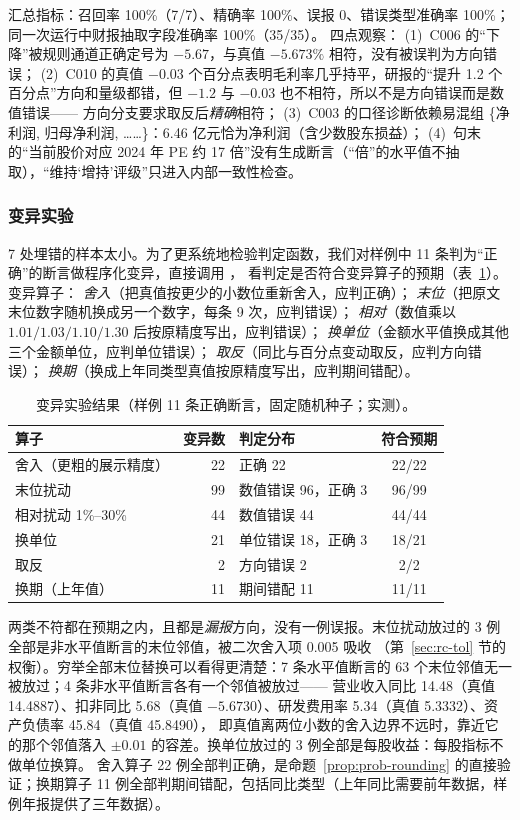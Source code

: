 汇总指标：召回率 100\%（7/7）、精确率 100\%、误报 0、错误类型准确率 100\%；同一次运行中财报抽取字段准确率 100\%（35/35）。
四点观察：
(1)~C006 的“下降”被规则通道正确定号为 $-5.67$，与真值 $-5.673\%$ 相符，没有被误判为方向错误；
(2)~C010 的真值 $-0.03$ 个百分点表明毛利率几乎持平，研报的“提升 1.2 个百分点”方向和量级都错，但 $-1.2$ 与 $-0.03$ 也不相符，所以不是方向错误而是数值错误——
方向分支要求取反后\emph{精确}相符；
(3)~C003 的口径诊断依赖易混组 \{净利润, 归母净利润, ……\}：6.46 亿元恰为净利润（含少数股东损益）；
(4)~句末的“当前股价对应 2024 年 PE 约 17 倍”没有生成断言（“倍”的水平值不抽取），“维持‘增持’评级”只进入内部一致性检查。

\subsubsection{变异实验}
\label{sec:rc-mutation}

7 处埋错的样本太小。为了更系统地检验判定函数，我们对样例中 11 条判为“正确”的断言做程序化变异，直接调用 ，
看判定是否符合变异算子的预期（表~\ref{tab:rc-mutation}）。变异算子：
\emph{舍入}（把真值按更少的小数位重新舍入，应判正确）；
\emph{末位}（把原文末位数字随机换成另一个数字，每条 9 次，应判错误）；
\emph{相对}（数值乘以 $1.01/1.03/1.10/1.30$ 后按原精度写出，应判错误）；
\emph{换单位}（金额水平值换成其他三个金额单位，应判单位错误）；
\emph{取反}（同比与百分点变动取反，应判方向错误）；
\emph{换期}（换成上年同类型真值按原精度写出，应判期间错配）。

\begin{table}[t]
\centering
\caption{变异实验结果（样例 11 条正确断言，固定随机种子；实测）。}
\label{tab:rc-mutation}
\small
\begin{tabular}{@{}lrlc@{}}
\toprule
算子 & 变异数 & 判定分布 & 符合预期 \\
\midrule
舍入（更粗的展示精度） & 22 & 正确 22 & 22/22 \\
末位扰动 & 99 & 数值错误 96，正确 3 & 96/99 \\
相对扰动 1\%--30\% & 44 & 数值错误 44 & 44/44 \\
换单位 & 21 & 单位错误 18，正确 3 & 18/21 \\
取反 & 2 & 方向错误 2 & 2/2 \\
换期（上年值） & 11 & 期间错配 11 & 11/11 \\
\bottomrule
\end{tabular}
\end{table}

两类不符都在预期之内，且都是\emph{漏报}方向，没有一例误报。末位扰动放过的 3 例全部是非水平值断言的末位邻值，被二次舍入项 0.005 吸收
（第~\ref{sec:rc-tol} 节的权衡）。穷举全部末位替换可以看得更清楚：7 条水平值断言的 63 个末位邻值无一被放过；4 条非水平值断言各有一个邻值被放过——
营业收入同比 14.48（真值 14.4887）、扣非同比 5.68（真值 $-5.6730$）、研发费用率 5.34（真值 5.3332）、资产负债率 45.84（真值 45.8490），
即真值离两位小数的舍入边界不远时，靠近它的那个邻值落入 $\pm0.01$ 的容差。换单位放过的 3 例全部是每股收益：每股指标不做单位换算。
舍入算子 22 例全部判正确，是命题~\ref{prop:prob-rounding} 的直接验证；换期算子 11 例全部判期间错配，包括同比类型（上年同比需要前年数据，样例年报提供了三年数据）。

